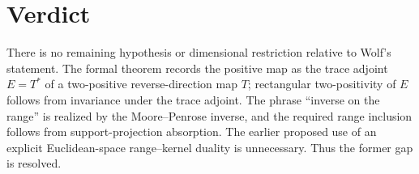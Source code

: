 \documentclass{article}
\begin{document}
\section{Verdict}

There is no remaining hypothesis or dimensional restriction relative to
Wolf's statement.  The formal theorem records the positive map as the trace
adjoint $E=T^*$ of a two-positive reverse-direction map $T$; rectangular
two-positivity of $E$ follows from invariance under the trace adjoint.  The
phrase ``inverse on the range'' is realized by the
Moore--Penrose inverse, and the required range inclusion follows from
support-projection absorption.  The earlier proposed use of an explicit
Euclidean-space range--kernel duality is unnecessary.  Thus the former gap is
resolved.
\end{document}
